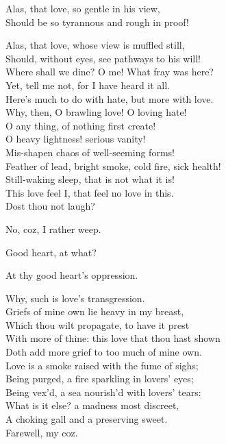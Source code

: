 \begin{speech}
Alas, that love, so gentle in his view, \\
Should be so tyrannous and rough in proof! \\
\end{speech}
\begin{speech}
Alas, that love, whose view is muffled still, \\
Should, without eyes, see pathways to his will! \\
Where shall we dine?   O me!   What fray was here? \\
Yet, tell me not, for I have heard it all. \\
Here's much to do with hate, but more with love. \\
Why, then, O brawling love! O loving hate! \\
O any thing, of nothing first create! \\
O heavy lightness! serious vanity! \\
Mis-shapen chaos of well-seeming forms! \\
Feather of lead, bright smoke, cold fire, sick health! \\
Still-waking sleep, that is not what it is! \\
This love feel I, that feel no love in this. \\
Dost thou not laugh? \\
\end{speech}
\begin{speech}
No, coz, I rather weep. \\
\end{speech}
\begin{speech}
Good heart, at what? \\
\end{speech}
\begin{speech}
At thy good heart's oppression. \\
\end{speech}
\begin{speech}
Why, such is love's transgression. \\
Griefs of mine own lie heavy in my breast, \\
Which thou wilt propagate, to have it prest \\
With more of thine: this love that thou hast shown \\
Doth add more grief to too much of mine own. \\
Love is a smoke raised with the fume of sighs; \\
Being purged, a fire sparkling in lovers' eyes; \\
Being vex'd, a sea nourish'd with lovers' tears: \\
What is it else? a madness most discreet, \\
A choking gall and a preserving sweet. \\
Farewell, my coz. \\
\end{speech}
